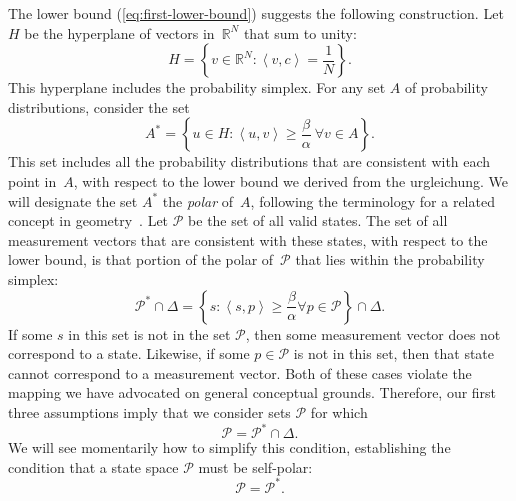 \documentclass[aps,pra,superscriptaddress,10pt,tightenlines,twocolumn,nofootinbib]{revtex4}
\theoremstyle{remark}
\newcommand{\be}{\begin{equation}}
\newcommand{\ee}{\end{equation}}
\newcommand{\fd}[1]{\mathbb{#1}}
\newcommand{\dl}[1]{#1^{*}}
\newcommand{\cP}{\mathcal{P}}
\newcommand{\inprod}[2]{{\left\langle #1 , #2 \right\rangle}}
\begin{document}
The lower bound (\ref{eq:first-lower-bound}) suggests the following construction.  Let $H$ be the hyperplane of vectors in~$\mathbb{R}^N$ that sum to unity:
\be
H =\left\{v \in \fd{R}^{N} \colon  \inprod{v}{c} = \frac{1}{N}\right\}.
\ee
This hyperplane includes the probability simplex.  For any set $A$ of probability distributions, consider the set
\be
\dl{A} = \left\{ u \in H \colon  \inprod{u}{v} \ge \frac{\beta}{\alpha} \ \forall v \in A\right\}.
\ee
This set includes all the probability distributions that are consistent with each point in~$A$, with respect to the lower bound we derived from the urgleichung.  We will designate the set $\dl{A}$ the \emph{polar} of~$A$, following the terminology for a related concept in geometry~\cite{grun, zieg}.  Let $\cP$ be the set of all valid states.  The set of all measurement vectors that are consistent with these states, with respect to the lower bound, is that portion of the polar of~$\cP$ that lies within the probability simplex:
\be
\dl{\cP} \cap \Delta = \left\{ s : \inprod{s}{p} \geq \frac{\beta}{\alpha} \forall p \in \cP \right\} \cap \Delta.
\ee
If some $s$ in this set is not in the set $\cP$, then some measurement vector does not correspond to a state.  Likewise, if some $p \in \cP$ is not in this set, then that state cannot correspond to a measurement vector.  Both of these cases violate the mapping we have advocated on general conceptual grounds.  Therefore, our first three assumptions imply that we consider sets $\cP$ for which
\be
\cP = \dl{\cP} \cap \Delta.
\ee
We will see momentarily how to simplify this condition, establishing the condition that a state space $\cP$ must be self-polar:
\begin{equation}
\cP = \dl{\cP}.
\end{equation}
\end{document}
